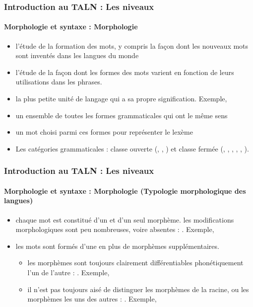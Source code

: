 \documentclass{beamer}
\begin{document}
\begin{frame}
\frametitle{Introduction au TALN : Les niveaux}
\framesubtitle{Morphologie et syntaxe : Morphologie}

\begin{itemize}
	\item l'étude de la formation des mots, y compris la façon dont les nouveaux mots sont inventés dans les langues du monde
	\item l'étude de la façon dont les formes des mots varient en fonction de leurs utilisations dans les phrases.
	\item {} la plus petite unité de langage qui a sa propre signification. Exemple, 
	\item {} un ensemble de toutes les formes grammaticales qui ont le même sens
	\item {} un mot choisi parmi ces formes pour représenter le lexème
	\item Les catégories grammaticales : classe ouverte (, , ) et classe fermée (, , , ,  , ).
\end{itemize}

\end{frame}


\begin{frame}
\frametitle{Introduction au TALN : Les niveaux}
\framesubtitle{Morphologie et syntaxe : Morphologie (Typologie morphologique des langues)}

\begin{itemize}
	\item {} chaque mot est constitué d'un et d'un seul morphème. les modifications morphologiques sont peu nombreuses, voire absentes : . Exemple, 
	\item {} les mots sont formés d'une  en plus de morphèmes supplémentaires.
	\begin{itemize}
		\item {} les morphèmes sont toujours clairement différentiables phonétiquement l'un de l'autre : . Exemple,  
		\item {} il n'est pas toujours aisé de distinguer les morphèmes de la racine, ou les morphèmes les uns des autres : . Exemple, 
	\end{itemize}
\end{itemize}

\end{frame}
\end{document}
